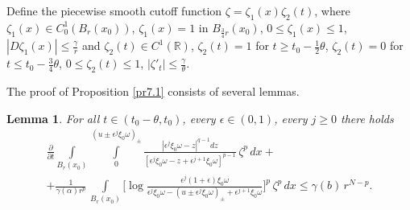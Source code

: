 \documentclass[a4paper,11pt,fullpage]{article}
\numberwithin{equation}{section}
\newtheorem{lemma}{Lemma}[section]
\begin{document}
Define the piecewise smooth cutoff function $\zeta=\zeta_1(x) \zeta_2(t)$, where $\zeta_1(x)\in C^1_0(B_r(x_0))$, $\zeta_1(x)=1$ in $B_{\frac{3}{4} r}(x_0)$, $0\leqslant \zeta_1(x)\leqslant 1$, $|D \zeta_1(x)|\leqslant \frac{\gamma}{r}$ and $\zeta_2(t)\in C^1(\mathbb{R})$,
$\zeta_2(t)=1$ for $t\geqslant t_0-\frac{1}{2}\theta$, $\zeta_2(t)=0$ for $t\leqslant t_0-\frac{3}{4}\theta$, $0\leqslant \zeta_2(t)\leqslant 1$, $|\zeta'_t|\leqslant \frac{\gamma}{\theta}$.

The proof of Proposition \ref{pr7.1} consists of several lemmas. 

\begin{lemma}\label{lem7.1}
For   all $t\in (t_0-\theta, t_0)$, every $\epsilon \in (0, 1)$, every $j\geqslant 0$ there holds
\begin{multline}\label{eq7.6}
\frac{\partial}{\partial t}\int\limits_{B_r(x_0)}\int\limits^{(u\pm\epsilon^j\xi_0\omega)_{\pm}}_0\frac{|\epsilon^j\xi_0\omega-z|^{q-1} dz}{[\epsilon^j\xi_0\omega-z+\epsilon^{j+1}\xi_0\omega]^{p-1}}\,\zeta^p\,dx+\\+
\frac{1}{\gamma(\alpha) r^p}\,\int\limits_{B_r(x_0)}\Big[\log\frac{\epsilon^j(1+\epsilon)\xi_0\omega}{\epsilon^j\xi_0\omega-(u\pm\epsilon^j\xi_0\omega)_{\pm}+
\epsilon^{j+1}\xi_0\omega}\Big]^p\,
\zeta^p\,dx\leqslant\gamma(b)\,r^{N-p}.
\end{multline}
\end{lemma}
\end{document}
